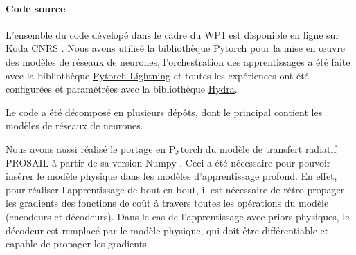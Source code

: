 \paragraph{Code source}
L’ensemble du code dévelopé dans le cadre du WP1 est disponible en ligne sur \href{https://src.koda.cnrs.fr/mmdc}{Koda CNRS} . Nous avons utilisé la bibliothèque \href{https://pytorch.org/}{Pytorch} pour la mise en œuvre des modèles de réseaux de neurones, l’orchestration des apprentissages a été faite avec la bibliothèque \href{https://lightning.ai/}{Pytorch Lightning} et toutes les expériences ont été configurées et paramétrées avec la bibliothèque \href{https://hydra.cc/}{Hydra}.

Le code a été décomposé en plusieurs dépôts, dont \href{https://src.koda.cnrs.fr/mmdc/mmdc-singledate}{le principal} contient les modèles de réseaux de neurones.

Nous avons aussi réalisé le portage en Pytorch du modèle de transfert radiatif PROSAIL \cite{jacquemoud-2009-prosp-sail-model} à partir de sa version Numpy \cite{domenzain19}. Ceci a été nécessaire pour pouvoir insérer le modèle physique dans les modèles d’apprentissage profond. En effet, pour réaliser l’apprentissage de bout en bout, il est nécessaire de rétro-propager les gradients des fonctions de coût à travers toutes les opérations du modèle (encodeurs et décodeurs). Dans le cas de l’apprentissage avec priors physiques, le décodeur est remplacé par le modèle physique, qui doit être différentiable et capable de propager les gradients.

